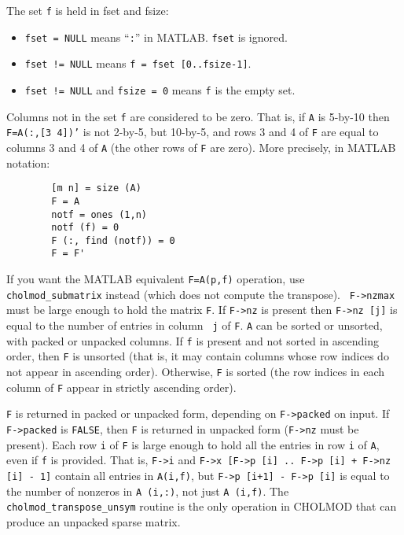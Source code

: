 \documentclass[11pt]{article}
\begin{document}
\noindent
The set {\tt f} is held in fset and fsize:
\begin{itemize}
\item  {\tt fset = NULL} means ``{\tt :}'' in MATLAB. {\tt fset} is ignored.
\item  {\tt fset != NULL} means {\tt f = fset [0..fsize-1]}.
\item  {\tt fset != NULL} and {\tt fsize = 0} means {\tt f} is the empty set.
\end{itemize}

Columns not in the set {\tt f} are considered to be zero.  That is,
if {\tt A} is 5-by-10 then {\tt F=A(:,[3 4])'} is not 2-by-5, but 10-by-5,
and rows 3 and 4 of {\tt F} are equal to columns 3 and 4 of {\tt A} (the other
rows of {\tt F} are zero).  More precisely, in MATLAB notation:

\begin{verbatim}
        [m n] = size (A)
        F = A
        notf = ones (1,n)
        notf (f) = 0
        F (:, find (notf)) = 0
        F = F'
\end{verbatim}

If you want the MATLAB equivalent {\tt F=A(p,f)} operation, use {\tt
cholmod\_submatrix} instead (which does not compute the transpose).  {\tt
F->nzmax} must be large enough to hold the matrix {\tt F}.  If {\tt F->nz} is
present then {\tt F->nz [j]} is equal to the number of entries in column {\tt
j} of {\tt F}.  {\tt A} can be sorted or unsorted, with packed or unpacked
columns.  If {\tt f} is present and not sorted in ascending order, then {\tt F}
is unsorted (that is, it may contain columns whose row indices do not appear in
ascending order).  Otherwise, {\tt F} is sorted (the row indices in each column
of {\tt F} appear in strictly ascending order).

{\tt F} is returned in packed or unpacked form, depending on {\tt F->packed} on
input.  If {\tt F->packed} is {\tt FALSE}, then {\tt F} is returned in unpacked
form ({\tt F->nz} must be present).  Each row {\tt i} of {\tt F} is large
enough to hold all the entries in row {\tt i} of {\tt A}, even if {\tt f} is
provided.  That is, {\tt F->i} and {\tt F->x [F->p [i] .. F->p [i] + F->nz [i]
- 1]} contain all entries in {\tt A(i,f)}, but {\tt F->p [i+1] - F->p [i]} is
equal to the number of nonzeros in {\tt A (i,:)}, not just {\tt A (i,f)}.  The
{\tt cholmod\_transpose\_unsym} routine is the only operation in CHOLMOD that
can produce an unpacked sparse matrix.

\end{document}
